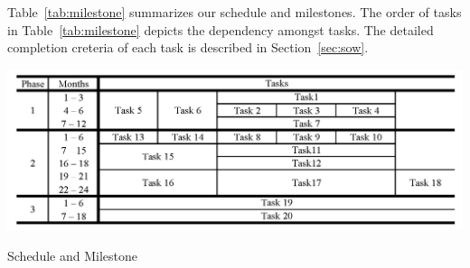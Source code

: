 Table~\ref{tab:milestone} summarizes our schedule and milestones.
The order of tasks in Table~\ref{tab:milestone} depicts the dependency amongst tasks.
The detailed completion creteria of each task is described in Section~\ref{sec:sow}.

\begin{table}
\center
\includegraphics[width=1.0\linewidth]{fig/milestone.png}
\caption{Schedule and Milestone}
\label{tab:milestone}
\end{table}

